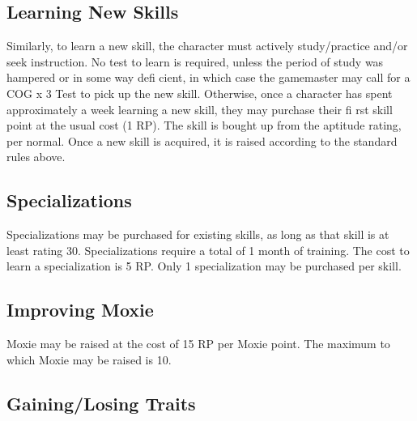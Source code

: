 \subsection{Learning New Skills} \label{sec:learning-new-skills} 

Similarly, to learn a new skill, the character must actively study/practice and/or seek instruction. No test to learn is required, unless the period of study was hampered or in some way defi cient, in which case the gamemaster may call for a COG x 3 Test to pick up the new skill. Otherwise, once a character has spent approximately a week learning a new skill, they may purchase their fi rst skill point at the usual cost (1 RP). The skill is bought up from the aptitude rating, per normal. Once a new skill is acquired, it is raised according to the standard rules above. 

\subsection{Specializations} \label{sec:new-specializations} Specializations may be purchased for existing skills, as long as that skill is at least rating 30. Specializations require a total of 1 month of training. The cost to learn a specialization is 5 RP. Only 1 specialization may be purchased per skill. 

\subsection{Improving Moxie} \label{sec:improving-moxie} 

Moxie may be raised at the cost of 15 RP per Moxie point. The maximum to which Moxie may be raised is 10. 

\subsection{Gaining/Losing Traits} \label{sec:gaining-losing-traits} 

